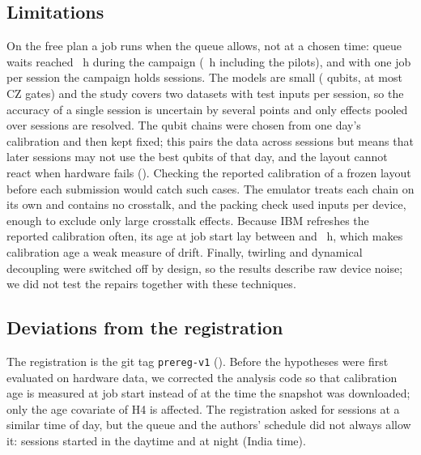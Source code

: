 \subsection{Limitations}
\label{sec:limitations}
On the free plan a job runs when the queue allows, not at a chosen time: queue waits reached
~h during the campaign (~h including the pilots), and with
one job per session the campaign holds  sessions. The models are small
( qubits, at most  CZ gates) and the study covers two datasets with
 test inputs per session, so the accuracy of a single session is uncertain by several
points and only effects pooled over sessions are resolved. The qubit chains were chosen from one
day's calibration and then kept fixed; this pairs the data across sessions but means that later
sessions may not use the best qubits of that day, and the layout cannot react when hardware
fails (). Checking the reported calibration of a frozen layout before each
submission would catch such cases. The emulator treats each chain on its own and contains no
crosstalk, and the packing check used  inputs per device, enough to exclude
only large crosstalk effects. Because IBM refreshes the reported calibration often, its age at
job start lay between  and ~h, which makes calibration age
a weak measure of drift. Finally, twirling and dynamical decoupling were switched off by design,
so the results describe raw device noise; we did not test the repairs together with these
techniques.

\subsection{Deviations from the registration}
\label{sec:discussion}
The registration is the git tag \texttt{prereg-v1} (). Before the hypotheses
were first evaluated on hardware data, we corrected the analysis code so that calibration age is
measured at job start instead of at the time the snapshot was downloaded; only the age
covariate of H4 is affected. The registration asked for sessions at a similar time of day, but
the queue and the authors' schedule did not always allow it:  sessions started
in the daytime and  at night (India time). 
 
